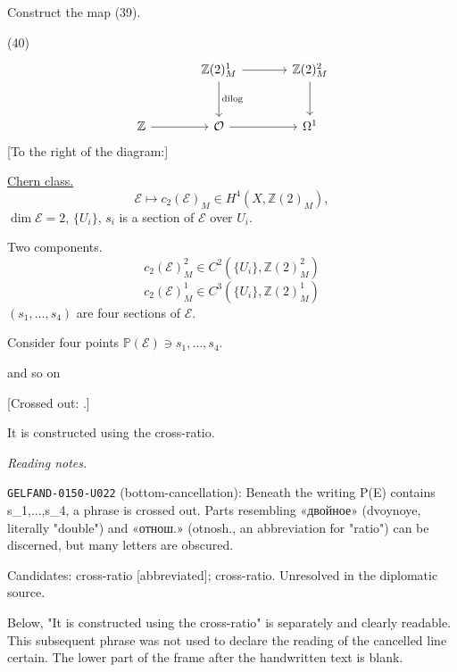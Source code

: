 Construct the map (39).

(40)
\begin{equation*}
\begin{tikzcd}[column sep=large,row sep=large]
&\mathbb Z(2)_M^1\arrow[r]\arrow[d,"\mathrm{dilog}"]
&\mathbb Z(2)_M^2\arrow[d]\\
\mathbb Z\arrow[r]&\mathcal O\arrow[r]&\Omega^1
\end{tikzcd}
\end{equation*}
[To the right of the diagram:]
\begin{center}
\end{center}
\underline{Chern class.}
\begin{equation*}
\mathcal E\longmapsto c_2(\mathcal E)_M\in H^4(X,\mathbb Z(2)_M),\tag{41}
\end{equation*}
$\dim\mathcal E=2$, $\{U_i\}$, $s_i$ is a section of $\mathcal E$ over $U_i$.

Two components.
\begin{equation*}
c_2(\mathcal E)_M^2\in C^2(\{U_i\},\mathbb Z(2)_M^2)
\end{equation*}
\begin{equation*}
c_2(\mathcal E)_M^1\in C^3(\{U_i\},\mathbb Z(2)_M^1)
\end{equation*}
$(s_1,\ldots,s_4)$ are four sections of $\mathcal E$.

Consider four points $\mathbb P(\mathcal E)\ni s_1,\ldots,s_4$.

and so on

[Crossed out: .]

It is constructed using the cross-ratio.

\par\smallskip\noindent\textit{Reading notes.}\par
\noindent\texttt{GELFAND-0150-U022} (bottom-cancellation): Beneath the writing P(E) contains s\_1,...,s\_4, a phrase is crossed out. Parts resembling «двойное» (dvoynoye, literally "double") and «отнош.» (otnosh., an abbreviation for "ratio") can be discerned, but many letters are obscured.\par
Candidates: cross-ratio [abbreviated]; cross-ratio. Unresolved in the diplomatic source.\par
Below, "It is constructed using the cross-ratio" is separately and clearly readable. This subsequent phrase was not used to declare the reading of the cancelled line certain. The lower part of the frame after the handwritten text is blank.\par
